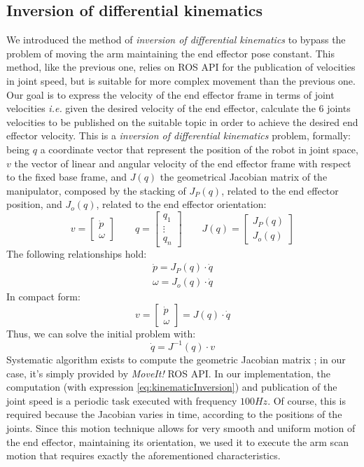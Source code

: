\subsection{Inversion of differential kinematics}
We introduced the method of \textit{inversion of differential kinematics} to bypass the problem of moving the arm maintaining the end effector pose constant. This method, like the previous one, relies on \ac{ROS} \ac{API} for the publication of velocities in joint speed, but is suitable for more complex movement than the previous one. Our goal is to express the velocity of the end effector frame in terms of  joint velocities \textit{i.e.} given the desired velocity of the end effector, calculate the 6 joints velocities to be published on the suitable topic in order to achieve the desired end effector velocity. 
This is a \textit{inversion of differential kinematics} problem, formally: being $q$ a coordinate vector that represent the position of the robot in joint space, 
$v$ the vector of linear and angular velocity of the end effector frame with respect to the fixed base frame, and $J(q)$ the geometrical Jacobian matrix of the manipulator, composed by the stacking of $J_P(q)$, related to the end effector position, and $J_o(q)$, related to the end effector orientation: 
\[
v = \left[\begin{array}{c}\dot{p} \\ \omega\end{array}\right] 	\qquad
q = \left[\begin{array}{c} q_1 \\ \vdots \\ q_n \end{array}\right]	\qquad
J(q) =  \left[\begin{array}{c} J_P(q) \\ J_o(q) \end{array}\right]
\]
 The following relationships hold: \\
 \begin{align*}
 \dot{p} = J_P(q)\cdot\dot{q} \\
 \omega = J_o(q)\cdot\dot{q} 
\end{align*}
In compact form:
\[
v = \left[\begin{array}{c}\dot{p} \\ \omega\end{array}\right] = J(q)\cdot\dot{q}
\]
Thus, we can solve the initial problem with: \\
\begin{equation}\label{eq:kinematicInversion}
\dot{q} = J^{-1}(q)\cdot v
\end{equation}
Systematic algorithm exists to compute the geometric Jacobian matrix \parencite{jacobian}; in our case, it's simply provided by \textit{MoveIt!} \ac{ROS} \ac{API}. 
In our implementation, the computation (with expression \ref{eq:kinematicInversion}) and publication of the joint speed is a periodic task executed with frequency $100Hz$. Of course, this is required because the Jacobian varies in time, according to the positions of the joints. Since this motion technique allows for very smooth and uniform motion of the end effector, maintaining its orientation, we used it to execute the arm scan motion that requires exactly the aforementioned characteristics.

